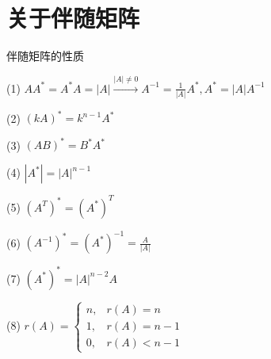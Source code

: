 \documentclass[12pt, a4paper, oneside, UTF8]{ctexbook}
\begin{document}
\section{关于伴随矩阵}
\begin{remark}
    伴随矩阵的性质
    \item[(1)] $AA^*=A^*A=\left|A\right|\xrightarrow{|A|\neq 0}A^{-1}=\frac{1}{|A|}A^*,A^*=|A|A^{-1}$
    \item[(2)] $(kA)^*=k^{n-1}A^*$
    \item[(3)] $(AB)^*=B^*A^*$
    \item[(4)] $|A^*|=\left|A\right|^{n-1}$
    \item[(5)] $(A^T)^*=(A^*)^T$
    \item[(6)] $(A^{-1})^*=(A^*)^{-1}=\frac{A}{\left|A\right|}$
    \item[(7)] $(A^*)^*=\left|A\right|^{n-2}A$
    \item[(8)] 
    $r(A)=
    \begin{cases}
        n,& r(A)=n\\
        1,& r(A)=n-1\\
        0,& r(A)<n-1
    \end{cases}
    $       
\end{remark}
\end{document}
